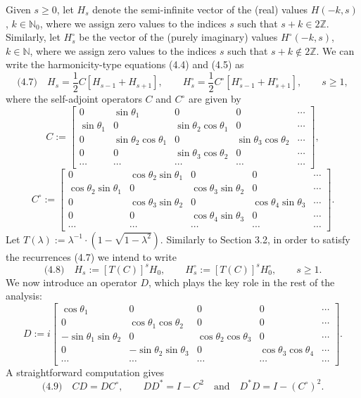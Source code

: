 \documentclass[11pt]{article}
\newcommand{\eql}[1]{\text{(#1)}\quad}
\begin{document}
Given $s \geqslant 0$, let $H_s$ denote the semi-infinite vector of the
(real) values $H(-k,s)$, $k \in \mathbb{N}_0$, where we assign zero values
to the indices $s$ such that $s+k \in 2\mathbb{Z}$. Similarly, let
$H_s^{\circ}$ be the vector of the (purely imaginary) values
$H^{\circ}(-k,s)$, $k \in \mathbb{N}$, where we assign zero values to the
indices $s$ such that $s+k \notin 2\mathbb{Z}$. We can write the
harmonicity-type equations (4.4) and (4.5) as
\[
\eql{4.7} H_s = \frac12 C[H_{s-1}+H_{s+1}],\qquad
H_s^{\circ} = \frac12 C^{\circ}[H_{s-1}^{\circ}+H_{s+1}^{\circ}],\qquad s \geqslant 1,
\]
where the self-adjoint operators $C$ and $C^{\circ}$ are given by
\[
C :=
\begin{bmatrix}
0 & \sin\theta_1 & 0 & 0 & \cdots\\
\sin\theta_1 & 0 & \sin\theta_2\cos\theta_1 & 0 & \cdots\\
0 & \sin\theta_2\cos\theta_1 & 0 & \sin\theta_3\cos\theta_2 & \cdots\\
0 & 0 & \sin\theta_3\cos\theta_2 & 0 & \cdots\\
\cdots & \cdots & \cdots & \cdots & \cdots
\end{bmatrix},
\]
\[
C^{\circ} :=
\begin{bmatrix}
0 & \cos\theta_2\sin\theta_1 & 0 & 0 & \cdots\\
\cos\theta_2\sin\theta_1 & 0 & \cos\theta_3\sin\theta_2 & 0 & \cdots\\
0 & \cos\theta_3\sin\theta_2 & 0 & \cos\theta_4\sin\theta_3 & \cdots\\
0 & 0 & \cos\theta_4\sin\theta_3 & 0 & \cdots\\
\cdots & \cdots & \cdots & \cdots & \cdots
\end{bmatrix}.
\]
Let $T(\lambda) := \lambda^{-1}\cdot(1-\sqrt{1-\lambda^2})$. Similarly to
Section 3.2, in order to satisfy the recurrences (4.7) we intend to write
\[
\eql{4.8} H_s := [T(C)]^s H_0, \qquad H_s^{\circ} := [T(C)]^s H_0^{\circ},
\qquad s \geqslant 1.
\]
We now introduce an operator $D$, which plays the key role in the rest of the
analysis:
\[
D := i
\begin{bmatrix}
\cos\theta_1 & 0 & 0 & 0 & \cdots\\
0 & \cos\theta_1\cos\theta_2 & 0 & 0 & \cdots\\
-\sin\theta_1\sin\theta_2 & 0 & \cos\theta_2\cos\theta_3 & 0 & \cdots\\
0 & -\sin\theta_2\sin\theta_3 & 0 & \cos\theta_3\cos\theta_4 & \cdots\\
\cdots & \cdots & \cdots & \cdots & \cdots
\end{bmatrix}.
\]
A straightforward computation gives
\[
\eql{4.9} CD = DC^{\circ},\qquad DD^{*} = I - C^2
\quad\text{and}\quad D^{*}D = I - (C^{\circ})^2.
\]
\end{document}
